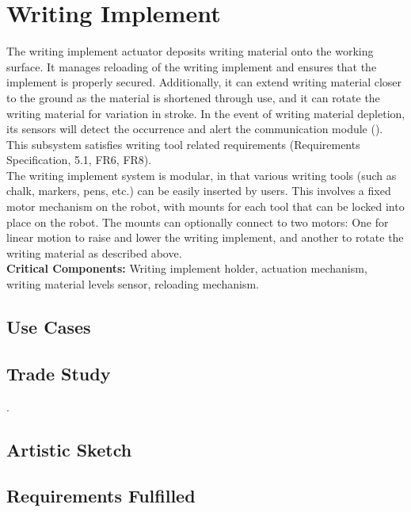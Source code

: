 
\section{Writing Implement}
\label{sec:writing_implement}
The writing implement actuator deposits writing material onto the working surface. It manages reloading of the writing implement and ensures that the implement is properly secured. Additionally, it can extend writing material closer to the ground as the material is shortened through use, and it can rotate the writing material for variation in stroke. In the event of writing material depletion, its sensors will detect the occurrence and alert the communication module (). This subsystem satisfies writing tool related requirements (Requirements Specification, 5.1, FR6, FR8).\\
The writing implement system is modular, in that various writing tools (such as chalk, markers, pens, etc.) can be easily inserted by users. This involves a fixed motor mechanism on the robot, with mounts for each tool that can be locked into place on the robot. The mounts can optionally connect to two motors: One for linear motion to raise and lower the writing implement, and another to rotate the writing material as described above. \\

\textbf{Critical Components:} Writing implement holder, actuation mechanism, writing material levels sensor, reloading mechanism. \\

\subsection{Use Cases}

\subsection{Trade Study}
. 

\subsection{Artistic Sketch}

\subsection{Requirements Fulfilled}